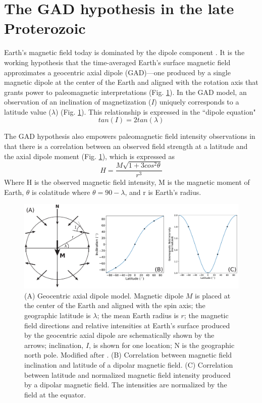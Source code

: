 \section*{The GAD hypothesis in the late Proterozoic}

Earth's magnetic field today is dominated by the dipole component \citep{Alken2021a}. It is the working hypothesis that the time-averaged Earth's surface magnetic field approximates a geocentric axial dipole (GAD)---one produced by a single magnetic dipole at the center of the Earth and aligned with the rotation axis that grants power to paleomagnetic interpretations (Fig. \ref{fig:GAD}). In the GAD model, an observation of an inclination of magnetization ($I$) uniquely corresponds to a latitude value ($\lambda$) (Fig. \ref{fig:GAD}). This relationship is expressed in the ``dipole equation" 
\begin{equation*}
    tan(I) = 2 tan(\lambda)
\label{direction_eq}
\end{equation*} 

The GAD hypothesis also empowers paleomagnetic field intensity observations in that there is a correlation between an observed field strength at a latitude and the axial dipole moment (Fig. \ref{fig:GAD}), which is expressed as 
\begin{equation*}
    H = \frac{M\sqrt{1+3cos^2\theta}}{r^3}
\label{intensity_eq}
\end{equation*} Where H is the observed magnetic field intensity, M is the magnetic moment of Earth, $\theta$ is colatitude where $\theta=90-\lambda$, and r is Earth's radius. 

\begin{figure}[h!]
    \centering
    \includegraphics[width=\textwidth]{figure/GAD.pdf}
    \caption[The GAD hypothesis]{(A) Geocentric axial dipole model. Magnetic dipole $M$ is placed at the center of the Earth and aligned with the spin axis; the geographic latitude is $\lambda$; the mean Earth radius is $r$; the magnetic field directions and relative intensities at Earth’s surface produced by the geocentric axial dipole are schematically shown by the arrows; inclination, $I$, is shown for one location; N is the geographic north pole. Modified after \cite{McElhinny1973a}. (B) Correlation between magnetic field inclination and latitude of a dipolar magnetic field. (C) Correlation between latitude and normalized magnetic field intensity produced by a dipolar magnetic field. The intensities are normalized by the field at the equator. }
    \label{fig:GAD}
\end{figure}

